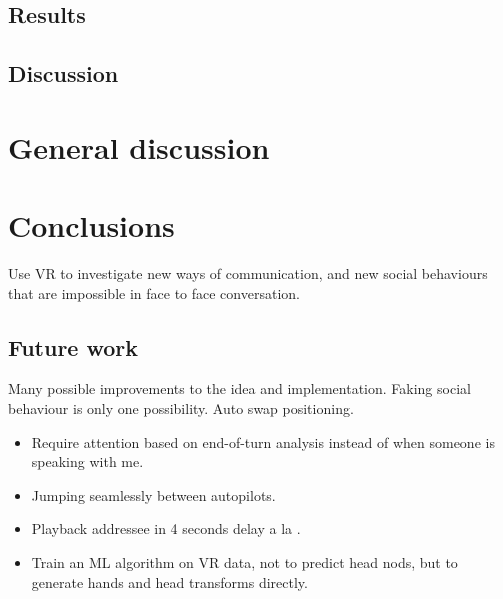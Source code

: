 \documentclass[]{simple-thesis}
\begin{document}
\section{Results}

\section{Discussion}


\chapter{General discussion}\label{general_discussion}


\chapter{Conclusions}\label{conclusions}

Use VR to investigate new ways of communication, and new social behaviours that are impossible in face to face conversation.

\section{Future work}

Many possible improvements to the idea and implementation.
Faking social behaviour is only one possibility.
Auto swap positioning.

\begin{itemize}
  \item Require attention based on end-of-turn analysis instead of when someone is speaking with me.
  \item Jumping seamlessly between autopilots.
  \item Playback addressee in 4 seconds delay a la \cite{Bailenson2005}.
  \item Train an ML algorithm on VR data, not to predict head nods, but to generate hands and head transforms directly.
\end{itemize}


\cleardoublepage
{}
{}


\end{document}
